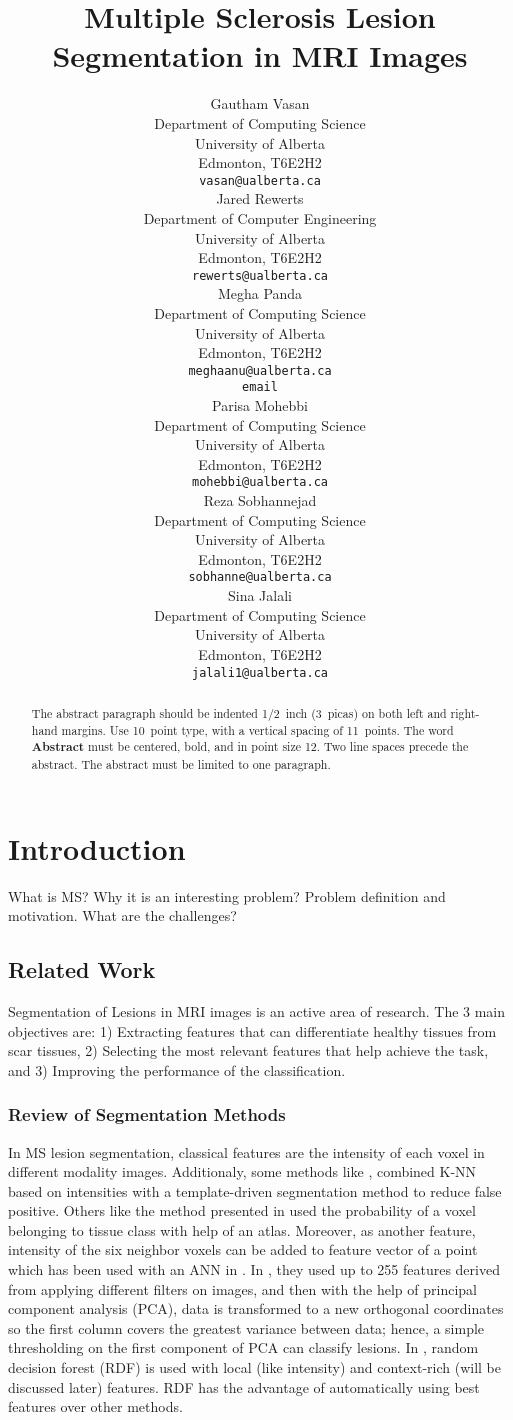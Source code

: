 \documentclass{article} %
\title{Multiple Sclerosis Lesion Segmentation in MRI Images }
\author{
Gautham Vasan \\
Department of Computing Science\\
University of Alberta\\
Edmonton, T6E2H2 \\
\texttt{vasan@ualberta.ca} \\
\And
Jared Rewerts \\
Department of Computer Engineering \\
University of Alberta \\Edmonton, T6E2H2 \\
\texttt{rewerts@ualberta.ca} \\
\And
Megha Panda \\
Department of Computing Science\\
University of Alberta \\Edmonton, T6E2H2 \\
\texttt{meghaanu@ualberta.ca} \\
\texttt{email} \\
\And
Parisa Mohebbi \\
Department of Computing Science \\
University of Alberta \\Edmonton, T6E2H2 \\
\texttt{mohebbi@ualberta.ca} \\
\And
Reza Sobhannejad \\
Department of Computing Science \\
University of Alberta \\Edmonton, T6E2H2 \\
\texttt{sobhanne@ualberta.ca} \\
\And
Sina Jalali  \\
Department of Computing Science \\
University of Alberta \\Edmonton, T6E2H2 \\
\texttt{jalali1@ualberta.ca} \\
}
\begin{document}
\maketitle
\begin{abstract}
The abstract paragraph should be indented 1/2~inch (3~picas) on both left and
right-hand margins. Use 10~point type, with a vertical spacing of 11~points.
The word \textbf{Abstract} must be centered, bold, and in point size 12. Two
line spaces precede the abstract. The abstract must be limited to one
paragraph.
\end{abstract}

\section{Introduction}
What is MS? Why it is an interesting problem? Problem definition and motivation. What are the challenges?

\subsection{Related Work}
Segmentation of Lesions in MRI images is an active area of research. The 3 main objectives are: 1) Extracting features that can differentiate healthy tissues from scar tissues, 2) Selecting the most relevant features that help achieve the task, and 3) Improving the performance of the classification.

\subsubsection{Review of Segmentation Methods}
In MS lesion segmentation, classical features are the intensity of each voxel in different modality images. Additionaly, some methods like  \cite{commowick2009continuous}, combined K-NN based on intensities with a template-driven segmentation method to reduce false positive. Others like the method presented in \cite{zijdenbos2002automatic} used the probability of a voxel belonging to tissue class with help of an atlas. Moreover, as another feature, intensity of the six neighbor voxels can be added to feature vector of a point which has been used with an ANN in \cite{younis2007ms}. In \cite{kroon2008multiple}, they used up to 255 features derived from applying different filters on images, and then with the help of principal component analysis (PCA), data is transformed to a new orthogonal coordinates so the first column covers the greatest variance between data; hence, a simple thresholding on the first component of PCA can classify lesions. In \cite{geremia2011spatial}, random decision forest (RDF) is used with local (like intensity) and context-rich (will be discussed later) features. RDF has the advantage of automatically using best features over other methods.
\end{document}
